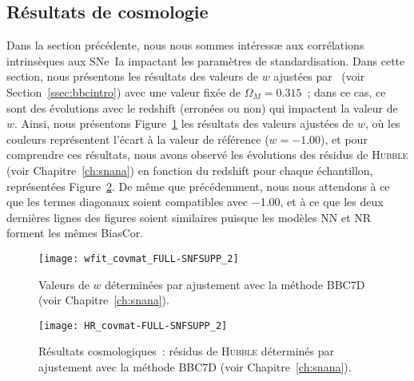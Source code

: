 \documentclass[../main/main.tex]{subfiles}
\begin{document}
\subsection{Résultats de cosmologie}\label{ssec:simw}

Dans la section précédente, nous nous sommes intéressæ aux corrélations
intrinsèques aux SNe~Ia impactant les paramètres de standardisation. Dans cette
section, nous présentons les résultats des valeurs de $w$ ajustées par \wfit\
(voir Section~\ref{ssec:bbcintro}) avec une valeur fixée de $\Omega_M =
\num{0.315}$~; dans ce cas, ce sont des évolutions avec le redshift (erronées ou
non) qui impactent la valeur de $w$. Ainsi, nous présentons
Figure~\ref{fig:wfit} les résultats des valeurs ajustées de $w$, où les couleurs
représentent l'écart à la valeur de référence ($w = \num{-1.00}$), et pour
comprendre ces résultats, nous avons observé les évolutions des résidus de
\textsc{Hubble} (voir Chapitre~\ref{ch:snana}) en fonction du redshift pour
chaque échantillon, représentées Figure~\ref{fig:hr}. De même que précédemment,
nous nous attendons à ce que les termes diagonaux soient compatibles avec
\num{-1.00}, et à ce que les deux dernières lignes des figures soient similaires
puisque les modèles NN et NR forment les mêmes BiasCor.

\begin{figure}[ht]
    \centering
    \texttt{[image: wfit\_covmat\_FULL-SNFSUPP\_2]}
    \caption[Résultats cosmologiques~: $w$]{Valeurs de $w$ déterminées par
    ajustement avec la méthode BBC7D (voir Chapitre~\ref{ch:snana}).}
    \label{fig:wfit}
\end{figure}

\begin{figure}[p]
    \centering
    \texttt{[image: HR\_covmat-FULL-SNFSUPP\_2]}
    \caption[Résultats cosmologiques~: résidus de \textsc{Hubble}]{Résultats
        cosmologiques~: résidus de \textsc{Hubble} déterminés par ajustement
    avec la méthode BBC7D (voir Chapitre~\ref{ch:snana}).}
    \label{fig:hr}
\end{figure}
\end{document}
